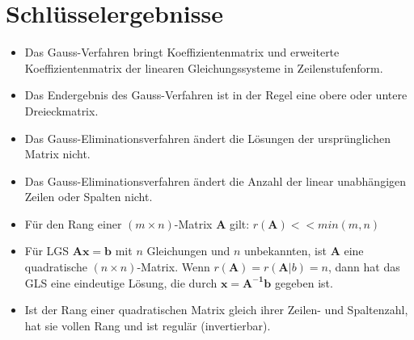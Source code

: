 \documentclass[../main.tex]{subfiles}
\begin{document}
\section{Schlüsselergebnisse}
\begin{itemize}
    \item Das Gauss-Verfahren bringt Koeffizientenmatrix und erweiterte Koeffizientenmatrix der linearen Gleichungssysteme in Zeilenstufenform.
    \item Das Endergebnis des Gauss-Verfahren ist in der Regel eine obere oder untere Dreieckmatrix.
    \item Das Gauss-Eliminationsverfahren ändert die Lösungen der ursprünglichen Matrix nicht.
    \item Das Gauss-Eliminationsverfahren ändert die Anzahl der linear unabhängigen Zeilen oder Spalten nicht.
    \item Für den Rang einer $(m\times n)$-Matrix $\mathbf{A}$ gilt: $r(\mathbf{A})<<min(m,n)$
    \item Für LGS $\mathbf{Ax}=\mathbf{b}$ mit $n$ Gleichungen und $n$ unbekannten, ist $\mathbf{A}$ eine quadratische $(n\times n)$-Matrix. 
    Wenn $r(\mathbf{A})=r(\mathbf{A}|b)=n$, dann hat das GLS eine eindeutige Lösung, die durch $\mathbf{x}=\mathbf{A^{-1}b}$ gegeben ist.
    \item Ist der Rang einer quadratischen Matrix gleich ihrer Zeilen- und Spaltenzahl, hat sie vollen Rang und ist regulär (invertierbar).
\end{itemize}
\end{document}
